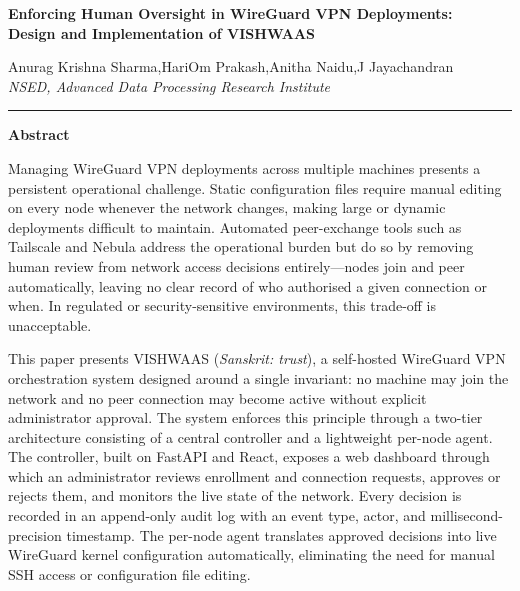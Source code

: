 \documentclass[12pt, a4paper]{article}
\begin{document}
\begin{center}
  {\Large\bfseries Enforcing Human Oversight in WireGuard VPN Deployments:\\[4pt]
  Design and Implementation of VISHWAAS}

  \vspace{10pt}

  {\normalsize
  Anurag Krishna Sharma,\quad HariOm Prakash,\quad Anitha Naidu,\quad J Jayachandran\\[2pt]
  \textit{NSED, Advanced Data Processing Research Institute}}

  \vspace{10pt}
  \noindent\rule{\linewidth}{0.4pt}
\end{center}

\begin{center}
  {\large\bfseries Abstract}
\end{center}

\noindent
Managing WireGuard VPN deployments across multiple machines presents a
persistent operational challenge. Static configuration files require manual
editing on every node whenever the network changes, making large or dynamic
deployments difficult to maintain. Automated peer-exchange tools such as
Tailscale and Nebula address the operational burden but do so by removing
human review from network access decisions entirely---nodes join and peer
automatically, leaving no clear record of who authorised a given connection
or when. In regulated or security-sensitive environments, this trade-off is
unacceptable.

This paper presents VISHWAAS (\textit{Sanskrit: trust}), a self-hosted
WireGuard VPN orchestration system designed around a single invariant: no
machine may join the network and no peer connection may become active without
explicit administrator approval. The system enforces this principle through a
two-tier architecture consisting of a central controller and a lightweight
per-node agent. The controller, built on FastAPI and React, exposes a web
dashboard through which an administrator reviews enrollment and connection
requests, approves or rejects them, and monitors the live state of the
network. Every decision is recorded in an append-only audit log with an event
type, actor, and millisecond-precision timestamp. The per-node agent translates
approved decisions into live WireGuard kernel configuration automatically,
eliminating the need for manual SSH access or configuration file editing.
\end{document}
